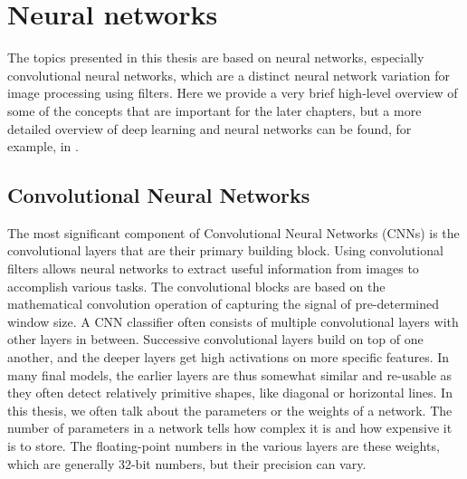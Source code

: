 \chapter{Neural networks}
The topics presented in this thesis are based on neural networks, especially convolutional neural networks, which are a distinct neural network variation for image processing using filters.
Here we provide a very brief high-level overview of some of the concepts that are important for the later chapters, but a more detailed overview of deep learning and neural networks can be found, for example, in \citep{deep-learning}.

\section{Convolutional Neural Networks}
The most significant component of Convolutional Neural Networks (CNNs) is the convolutional layers that are their primary building block.
Using convolutional filters allows neural networks to extract useful information from images to accomplish various tasks.
The convolutional blocks are based on the mathematical convolution operation of capturing the signal of pre-determined window size.
A CNN classifier often consists of multiple convolutional layers with other layers in between.
Successive convolutional layers build on top of one another, and the deeper layers get high activations on more specific features.
In many final models, the earlier layers are thus somewhat similar and re-usable as they often detect relatively primitive shapes, like diagonal or horizontal lines.
In this thesis, we often talk about the parameters or the weights of a network.
The number of parameters in a network tells how complex it is and how expensive it is to store.
The floating-point numbers in the various layers are these weights, which are generally 32-bit numbers, but their precision can vary.

